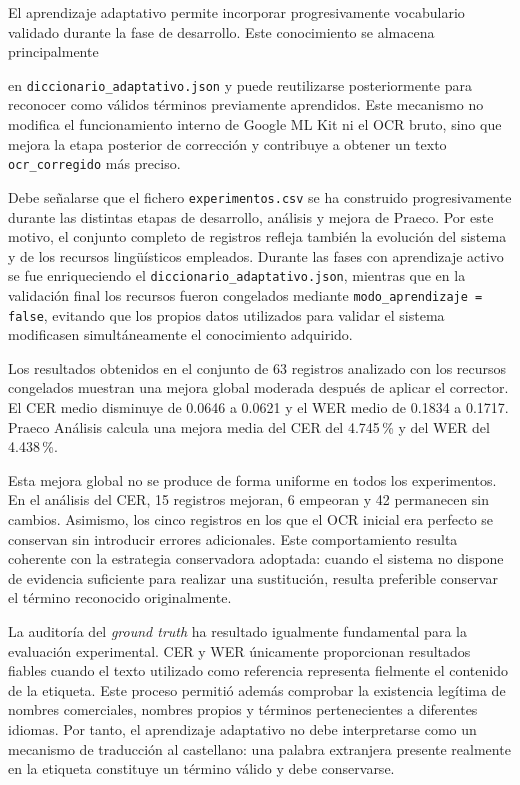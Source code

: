 El aprendizaje adaptativo permite incorporar progresivamente vocabulario validado durante la fase de desarrollo. Este conocimiento se almacena principalmente

 en \texttt{diccionario\_adaptativo.json} y puede reutilizarse posteriormente para reconocer como válidos términos previamente aprendidos. Este mecanismo no modifica el funcionamiento interno de Google ML Kit ni el OCR bruto, sino que mejora la etapa posterior de corrección y contribuye a obtener un texto \texttt{ocr\_corregido} más preciso.

Debe señalarse que el fichero \texttt{experimentos.csv} se ha construido progresivamente durante las distintas etapas de desarrollo, análisis y mejora de Praeco. Por este motivo, el conjunto completo de registros refleja también la evolución del sistema y de los recursos lingüísticos empleados. Durante las fases con aprendizaje activo se fue enriqueciendo el \texttt{diccionario\_adaptativo.json}, mientras que en la validación final los recursos fueron congelados mediante \texttt{modo\_aprendizaje = false}, evitando que los propios datos utilizados para validar el sistema modificasen simultáneamente el conocimiento adquirido.

Los resultados obtenidos en el conjunto de 63 registros analizado con los recursos congelados muestran una mejora global moderada después de aplicar el corrector. El CER medio disminuye de 0.0646 a 0.0621 y el WER medio de 0.1834 a 0.1717. Praeco Análisis calcula una mejora media del CER del 4.745\,\% y del WER del 4.438\,\%.

Esta mejora global no se produce de forma uniforme en todos los experimentos. En el análisis del CER, 15 registros mejoran, 6 empeoran y 42 permanecen sin cambios. Asimismo, los cinco registros en los que el OCR inicial era perfecto se conservan sin introducir errores adicionales. Este comportamiento resulta coherente con la estrategia conservadora adoptada: cuando el sistema no dispone de evidencia suficiente para realizar una sustitución, resulta preferible conservar el término reconocido originalmente.

La auditoría del \textit{ground truth} ha resultado igualmente fundamental para la evaluación experimental. CER y WER únicamente proporcionan resultados fiables cuando el texto utilizado como referencia representa fielmente el contenido de la etiqueta. Este proceso permitió además comprobar la existencia legítima de nombres comerciales, nombres propios y términos pertenecientes a diferentes idiomas. Por tanto, el aprendizaje adaptativo no debe interpretarse como un mecanismo de traducción al castellano: una palabra extranjera presente realmente en la etiqueta constituye un término válido y debe conservarse.

